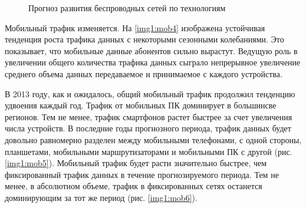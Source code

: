 \pgfplotsset{width=15cm, height=10cm, compat=1.3}
\begin{figure} [h]
  \center
{}
\caption{Прогноз развития беспроводных сетей по технологиям \cite{ericsson}}
  \label{img1:mob3}
\end{figure}


Мобильный трафик изменяется. На \ref{img1:mob4} изображена устойчивая тенденция роста трафика данных с некоторыми сезонными колебаниями. Это показывает, что мобильные данные абонентов сильно вырастут. Ведущую роль в увеличении общего количества трафика данных сыграло непрерывное увеличение среднего объема данных передаваемое и принимаемое с каждого устройства.


В 2013 году, как и ожидалось, общий мобильный трафик продолжил тенденцию удвоения каждый год. Трафик от мобильных ПК доминирует в большинсве регионов. Тем не менее, трафик смартфонов растет быстрее за счет увеличения числа устройств. В последние годы прогнозного периода, трафик данных будет довольно равномерно разделен между мобильными телефонами, с одной стороны, планшетами, мобильными маршрутизаторами и мобильными ПК с другой (рис. \ref{img1:mob5}). Мобильный трафик будет расти значительно быстрее, чем фиксированный трафик данных в течение прогнозируемого периода. Тем не менее, в абсолютном объеме, трафик в фиксированных сетях останется доминирующим за тот же период (рис. \ref{img1:mob6}). 


